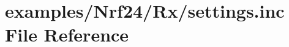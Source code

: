 \hypertarget{examples_2Nrf24_2Rx_2settings_8inc}{}\section{examples/\+Nrf24/\+Rx/settings.inc File Reference}
\label{examples_2Nrf24_2Rx_2settings_8inc}
